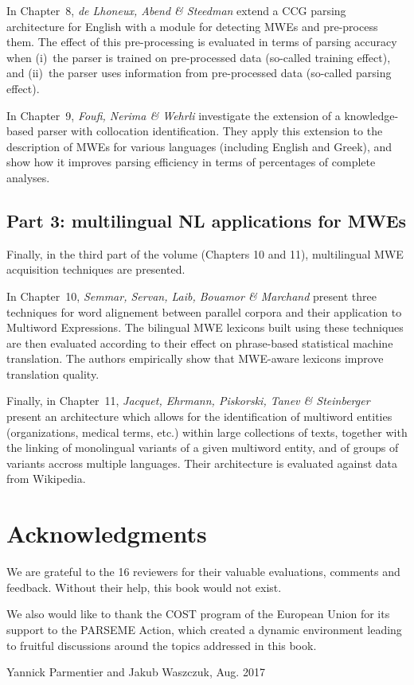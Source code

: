 \documentclass[output=paper]{langsci/langscibook}
\begin{document}
In Chapter~8, \textit{de Lhoneux, Abend \& Steedman} extend a CCG
parsing architecture for English with a module for detecting MWEs and
pre-process them. The effect of this pre-processing is evaluated in
terms of parsing accuracy when (i)~the parser is trained on
pre-processed data (so-called training effect), and (ii)~the parser
uses information from pre-processed data (so-called parsing effect).

In Chapter~9, \textit{Foufi, Nerima \& Wehrli} investigate the
extension of a knowledge-based parser with collocation
identification. They apply this extension to the description of MWEs
for various languages (including English and Greek), and show how it
improves parsing efficiency in terms of percentages of complete
analyses.

\subsection*{Part 3: multilingual NL applications for MWEs}

Finally, in the third part of the volume (Chapters 10 and 11),
multilingual MWE acquisition techniques are presented.

In Chapter~10, \textit{Semmar, Servan, Laib, Bouamor \& Marchand}
present three techniques for word alignement between parallel corpora
and their application to Multiword Expressions. The bilingual MWE
lexicons built using these techniques are then evaluated according to
their effect on phrase-based statistical machine translation. The
authors empirically show that MWE-aware lexicons improve translation
quality.

Finally, in Chapter~11, \textit{Jacquet, Ehrmann, Piskorski, Tanev \&
  Steinberger} present an architecture which allows for the
identification of multiword entities (organizations, medical terms,
etc.) within large collections of texts, together with the linking of
monolingual variants of a given multiword entity, and of groups of
variants accross multiple languages. Their architecture is evaluated
against data from Wikipedia.

\section*{Acknowledgments}

We are grateful to the 16 reviewers for their valuable evaluations,
comments and feedback. Without their help, this book would not exist.

We also would like to thank the COST program of the European Union for
its support to the PARSEME Action, which created a dynamic environment
leading to fruitful discussions around the topics addressed in this
book.

\begin{flushright}
  Yannick Parmentier and Jakub Waszczuk, Aug. 2017
\end{flushright}


\printbibliography[heading=subbibliography,notkeyword=this]
\end{document}
